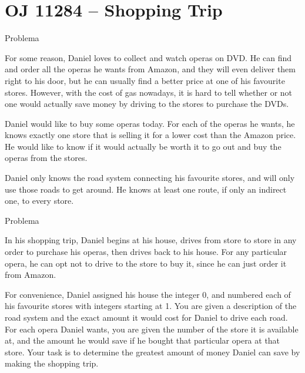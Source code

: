 \section{OJ 11284 -- Shopping Trip}

\begin{frame}[fragile]{Problema}

For some reason, Daniel loves to collect and watch operas on DVD. He can find and order all the 
operas he wants from Amazon, and they will even deliver them right to his door, but he can usually 
find a better price at one of his favourite stores. However, with the cost of gas nowadays, it is 
hard to tell whether or not one would actually save money by driving to the stores to purchase the 
DVDs.

Daniel would like to buy some operas today. For each of the operas he wants, he knows exactly
one store that is selling it for a lower cost than the Amazon price. He would like to know if it 
would actually be worth it to go out and buy the operas from the stores.

Daniel only knows the road system connecting his favourite stores, and will only use those roads to
get around. He knows at least one route, if only an indirect one, to every store.

\end{frame}

\begin{frame}[fragile]{Problema}

In his shopping trip, Daniel begins at his house, drives from store to store in any order to 
purchase his operas, then drives back to his house. For any particular opera, he can opt not to 
drive to the store to buy it, since he can just order it from Amazon.

For convenience, Daniel assigned his house the integer 0, and numbered each of his favourite stores
with integers starting at 1. You are given a description of the road system and the exact amount it
would cost for Daniel to drive each road. For each opera Daniel wants, you are given the number of 
the store it is available at, and the amount he would save if he bought that particular opera at 
that store.  Your task is to determine the greatest amount of money Daniel can save by making the 
shopping trip.

\end{frame}

